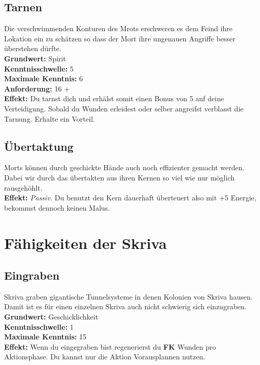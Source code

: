 \subsection*{Tarnen} \label{sk:tarnen}
Die verschwimmenden Konturen des Mrots erschweren es dem Feind ihre Lokation ein zu schätzen so dass der Mort ihre ungenauen Angriffe besser überstehen dürfte.\\
\textbf{Grundwert:} Spirit \\
\textbf{Kenntnisschwelle:} 5 \\
\textbf{Maximale Kenntnis:} 6 \\
\textbf{Anforderung:} 16 +\\
\textbf{Effekt:} Du tarnst dich und erhälst somit einen Bonus von 5 auf deine Verteidigung. Sobald du Wunden erleidest oder selber angreifst verblasst die Tarnung. Erhalte ein Vorteil.

\subsection*{Übertaktung} \label{sk:uebertaktung}
Morts können durch geschickte Hände auch noch effizienter gemacht werden. Dabei wir durch das übertakten aus ihren Kernen so viel wie nur möglich rausgehöhlt.\\
\textbf{Effekt:} \textit{Passiv.} Du benutzt den Kern dauerhaft überteuert also mit +5 Energie, bekommst dennoch keinen Malus.

\section{Fähigkeiten der Skriva} \label{skrivaskills}

\subsection*{Eingraben} \label{sk:eingraben}
Skriva graben gigantische Tunnelsysteme in denen Kolonien von Skriva hausen. Damit ist es für einen einzelnen Skriva auch nicht schwierig sich einzugraben. \\
\textbf{Grundwert:} Geschicklichkeit \\
\textbf{Kenntnisschwelle:} 1 \\
\textbf{Maximale Kenntnis:} 15 \\
\textbf{Effekt:} Wenn du eingegraben bist regenerierst du \textbf{FK} Wunden pro Aktionsphase. Du kannst nur die Aktion Vorausplannen nutzen.


